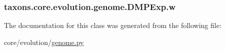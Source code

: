 \subsubsection[{\texorpdfstring{w}{w}}]{\setlength{\rightskip}{0pt plus 5cm}taxons.\+core.\+evolution.\+genome.\+D\+M\+P\+Exp.\+w}\hypertarget{classtaxons_1_1core_1_1evolution_1_1genome_1_1_d_m_p_exp_a105f7eb18bb41917dd3da9dd462a8092}{}\label{classtaxons_1_1core_1_1evolution_1_1genome_1_1_d_m_p_exp_a105f7eb18bb41917dd3da9dd462a8092}


The documentation for this class was generated from the following file\+:\begin{DoxyCompactItemize}
\item 
core/evolution/\hyperlink{genome_8py}{genome.\+py}\end{DoxyCompactItemize}
